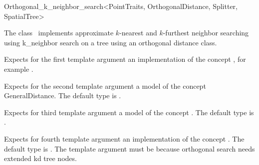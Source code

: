 

\begin{ccRefClass}{Orthogonal_k_neighbor_search<PointTraits, OrthogonalDistance, Splitter, SpatialTree>}


\ccDefinition

The class \ccRefName\ implements approximate $k$-nearest and
$k$-furthest neighbor searching using k_neighbor search on a tree
using an orthogonal distance class.


\ccParameters

Expects for the first template argument an implementation of the concept ,
for example .

Expects for the second template argument a model of the
concept GeneralDistance. The default type is 
.

Expects for third template argument a model of the concept .
The default type is .

Expects for fourth template argument an implementation of the concept .
The default type is .  The 
template argument must be  because orthogonal search needs extended 
kd tree nodes.

\ccTypes





\end{ccRefClass}
